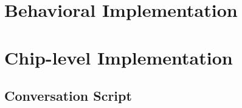 \section{Behavioral Implementation}
\section{Chip-level Implementation}
\subsection{Conversation Script}
